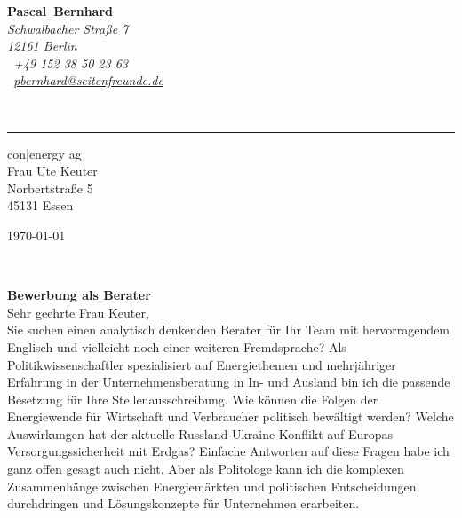 \documentclass[11pt,a4paper]{article}
\def\firstname{Pascal}
\def\familyname{Bernhard}
\begin{document}
\sffamily   %
\hfill%
\begin{minipage}[t]{.6\textwidth}
	\raggedleft%
	{\bfseries {\color{firstnamecolor}\firstname}~{\color{familynamecolor}\familyname}}\\[.35ex]
	\small\itshape%
	Schwalbacher Straße 7\\
	12161 Berlin\\[.35ex]
	\Mobilefone~+49 152 38 50 23 63 \\
	\Letter~\href{mailto:pbernhard@seitenfreunde.de}{pbernhard@seitenfreunde.de}
\end{minipage}\\[0.5em]
%
{\color{firstnamecolor}\rule{\textwidth}{.25ex}}
%
\begin{minipage}[t]{.4\textwidth}
	\raggedright%
	\vspace*{1em}
	con|energy ag\\
	Frau Ute Keuter\\[.35ex]
	\small%
	Norbertstraße 5 \\
	45131 Essen
\end{minipage}
%
\hfill
%
\begin{minipage}[t]{.4\textwidth}
	\raggedleft %
	\today
\end{minipage}\\[1em]
\raggedright

{\bfseries \color{familynamecolor}Bewerbung als Berater}\\[1.5em]

Sehr geehrte Frau Keuter,\\[1em]
%
Sie suchen einen analytisch denkenden Berater für Ihr Team mit hervorragendem Englisch und vielleicht noch einer weiteren Fremdsprache? Als Politikwissenschaftler spezialisiert auf Energiethemen und mehrjähriger Erfahrung in der Unternehmensberatung in In- und Ausland bin ich die passende Besetzung für Ihre Stellenausschreibung. Wie können die Folgen der Energiewende für Wirtschaft und Verbraucher politisch bewältigt werden? Welche Auswirkungen hat der aktuelle Russland-Ukraine Konflikt auf Europas Versorgungssicherheit mit Erdgas? Einfache Antworten auf diese Fragen habe ich ganz offen gesagt auch nicht. Aber als Politologe kann ich die komplexen Zusammenhänge zwischen Energiemärkten und politischen Entscheidungen durchdringen und Lösungskonzepte für Unternehmen erarbeiten.
\end{document}
